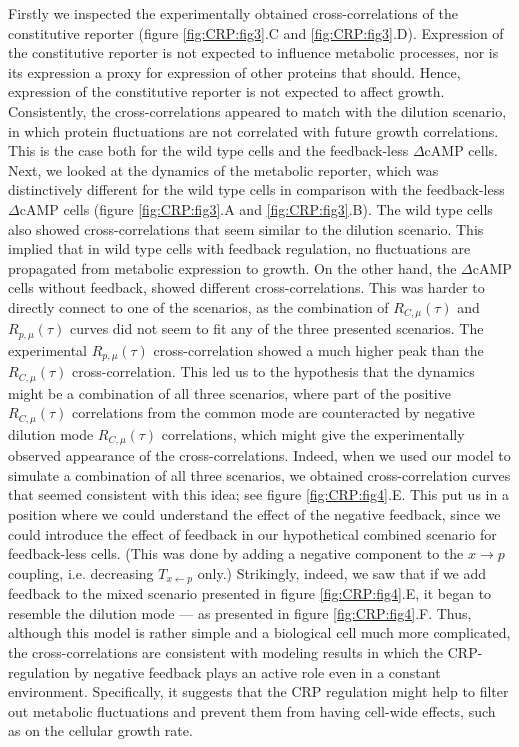 Firstly we inspected the experimentally obtained cross-correlations of the constitutive reporter (figure \ref{fig:CRP:fig3}.C and \ref{fig:CRP:fig3}.D).
Expression of the constitutive reporter is not expected to influence metabolic processes, nor is its expression a proxy for expression of other proteins that should.
Hence, expression of the constitutive reporter is not expected to affect growth.
Consistently, the cross-correlations appeared to match with the dilution scenario, in which protein fluctuations are not correlated with future growth correlations.
%
This is the case both for the wild type cells and the feedback-less $\Delta$cAMP cells.
%
Next, we looked at the dynamics of the metabolic reporter, which was distinctively different for the wild type cells in comparison with the feedback-less $\Delta$cAMP cells (figure \ref{fig:CRP:fig3}.A and \ref{fig:CRP:fig3}.B).
%
The wild type cells also showed cross-correlations that seem similar to the dilution scenario.
This implied that in wild type cells with feedback regulation, no fluctuations are propagated from metabolic expression to growth.
%
On the other hand, the $\Delta$cAMP cells without feedback, showed different cross-correlations.
%
This was harder to directly connect to one of the scenarios, as the combination of $R_{C,\mu}(\tau)$ and $R_{p,\mu}(\tau)$ curves did not seem to fit any of the three presented scenarios.
%
The experimental 
$R_{p,\mu}(\tau)$ cross-correlation showed a much higher peak than the $R_{C,\mu}(\tau)$ cross-correlation.
%
This led us to the hypothesis that the dynamics might be a combination of all three scenarios, where part of the positive $R_{C,\mu}(\tau)$ correlations from the common mode are counteracted by negative dilution mode $R_{C,\mu}(\tau)$ correlations,
which might give the experimentally observed appearance of the cross-correlations.
%
Indeed, when we used our model to simulate a combination of all three scenarios, we obtained cross-correlation curves that seemed consistent with this idea; see figure \ref{fig:CRP:fig4}.E.
%
This put us in a position where we could understand the effect of the negative feedback,
%
since we could introduce the effect of feedback in our hypothetical combined scenario for feedback-less cells.
%
(This was done by adding a negative component to the $x\rightarrow{p}$ coupling, i.e. decreasing $T_{x\leftarrow{p}}$ only.)
%
Strikingly, indeed, we saw that if we add feedback to the mixed scenario presented in figure \ref{fig:CRP:fig4}.E, it began to resemble the dilution mode --- as presented in figure \ref{fig:CRP:fig4}.F.
%
Thus, although this model is rather simple and a biological cell much more complicated, %
the cross-correlations are consistent with modeling results 
in which the CRP-regulation by negative feedback plays an active role even in a constant environment.
Specifically, it suggests that the CRP regulation might help to filter out metabolic fluctuations and prevent them from having cell-wide effects, such as on the cellular growth rate.


